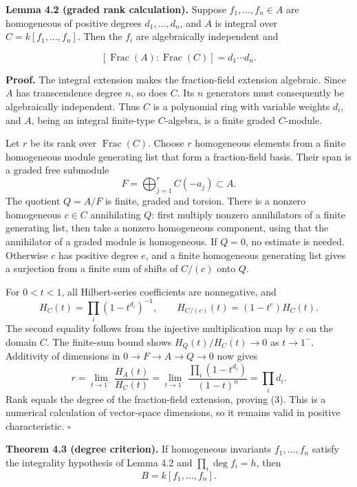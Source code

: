 \documentclass[
]{article}
\begin{document}
\protect{}\label{lemma-4-2}{}

\textbf{Lemma 4.2 (graded rank calculation).} Suppose
\(f_1,\ldots,f_n\in A\) are homogeneous of positive degrees
\(d_1,\ldots,d_n\), and \(A\) is integral over \(C=k [f_1,\ldots,f_n]\).
Then the \(f_i\) are algebraically independent and
\protect{}\label{equation-3}{}

\[
[\operatorname{Frac}(A):\operatorname{Frac}(C)]=d_1\cdots d_n.
\tag{3}
\]

\textbf{Proof.} The integral extension makes the fraction-field
extension algebraic. Since \(A\) has transcendence degree \(n\), so does
\(C\). Its \(n\) generators must consequently be algebraically
independent. Thus \(C\) is a polynomial ring with variable weights
\(d_i\), and \(A\), being an integral finite-type \(C\)-algebra, is a
finite graded \(C\)-module.

Let \(r\) be its rank over \(\operatorname{Frac}(C)\). Choose \(r\)
homogeneous elements from a finite homogeneous module generating list
that form a fraction-field basis. Their span is a graded free submodule
\[
F=\bigoplus_{j=1}^r C(-a_j)\subset A.
\] The quotient \(Q=A/F\) is finite, graded and torsion. There is a
nonzero homogeneous \(c\in C\) annihilating \(Q\): first multiply
nonzero annihilators of a finite generating list, then take a nonzero
homogeneous component, using that the annihilator of a graded module is
homogeneous. If \(Q=0\), no estimate is needed. Otherwise \(c\) has
positive degree \(e\), and a finite homogeneous generating list gives a
surjection from a finite sum of shifts of \(C/(c)\) onto \(Q\).

For \(0<t<1\), all Hilbert-series coefficients are nonnegative, and \[
H_C(t)=\prod_i(1-t^{d_i})^{-1},\qquad
H_{C/(c)}(t)=(1-t^e)H_C(t).
\] The second equality follows from the injective multiplication map by
\(c\) on the domain \(C\). The finite-sum bound shows
\(H_Q(t)/H_C(t)\to0\) as \(t\to1^-\). Additivity of dimensions in
\(0\to F\to A\to Q\to0\) now gives \[
r=\lim_{t\to1^-}\frac{H_A(t)}{H_C(t)}
=\lim_{t\to1^-}\frac{\prod_i(1-t^{d_i})}{(1-t)^n}
=\prod_i d_i.
\] Rank equals the degree of the fraction-field extension, proving (3).
This is a numerical calculation of vector-space dimensions, so it
remains valid in positive characteristic. \(\square\)

\protect{}\label{theorem-4-3}{}

\textbf{Theorem 4.3 (degree criterion).} If homogeneous invariants
\(f_1,\ldots,f_n\) satisfy the integrality hypothesis of Lemma 4.2 and
\(\prod_i\deg f_i=h\), then \[
B=k [f_1,\ldots,f_n].
\]
\end{document}

